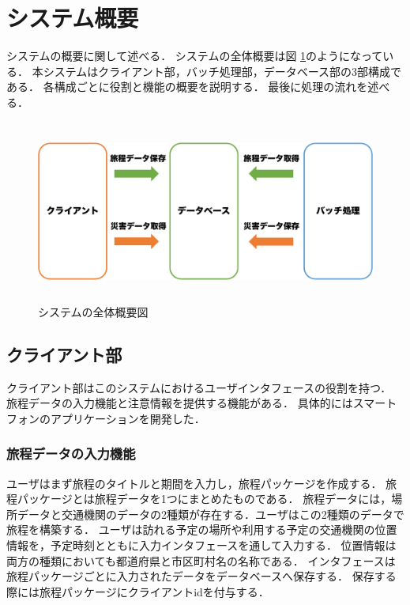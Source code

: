 \section{システム概要}
システムの概要に関して述べる．
システムの全体概要は図 \ref{fig:system_summary}のようになっている．
本システムはクライアント部，バッチ処理部，データベース部の3部構成である．
各構成ごとに役割と機能の概要を説明する．
最後に処理の流れを述べる．

\begin{figure}[h]
  \centering
  \includegraphics[height=6cm]{figure31.pdf}
  \caption{システムの全体概要図}
  \label{fig:system_summary}
\end{figure}

\subsection{クライアント部}
クライアント部はこのシステムにおけるユーザインタフェースの役割を持つ．
旅程データの入力機能と注意情報を提供する機能がある．
具体的にはスマートフォンのアプリケーションを開発した．

\subsubsection{旅程データの入力機能}
ユーザはまず旅程のタイトルと期間を入力し，旅程パッケージを作成する．
旅程パッケージとは旅程データを1つにまとめたものである．
旅程データには，場所データと交通機関のデータの2種類が存在する．ユーザはこの2種類のデータで旅程を構築する．
ユーザは訪れる予定の場所や利用する予定の交通機関の位置情報を，予定時刻とともに入力インタフェースを通して入力する．
位置情報は両方の種類においても都道府県と市区町村名の名称である．
インタフェースは旅程パッケージごとに入力されたデータをデータベースへ保存する．
保存する際には旅程パッケージにクライアントidを付与する．

